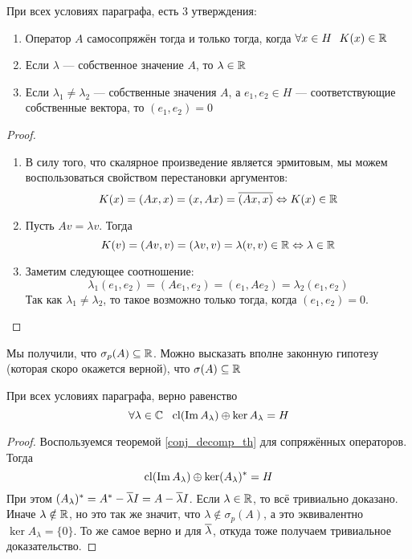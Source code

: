 \begin{theorem}
	При всех условиях параграфа, есть 3 утверждения:
	\begin{enumerate}
		\item Оператор $A$ самосопряжён тогда и только тогда, когда $\forall x \in H\ \ K(x) \in \mathbb{R}$
		
		\item Если $\lambda$ --- собственное значение $A$, то $\lambda \in \mathbb{R}$
		
		\item Если $\lambda_1 \neq \lambda_2$ --- собственные значения $A$, а $e_1, e_2 \in H$ --- соответствующие собственные вектора, то $(e_1, e_2) = 0$
	\end{enumerate}
\end{theorem}

\begin{proof}~
	\begin{enumerate}
		\item В силу того, что скалярное произведение является эрмитовым, мы можем воспользоваться свойством перестановки аргументов:
		\[
			K(x) = (Ax, x) = (x, Ax) = \overline{(Ax, x)} \Leftrightarrow K(x) \in \mathbb{R}
		\]
		
		\item Пусть $Av = \lambda v$. Тогда
		\[
			K(v) = (Av, v) = (\lambda v, v) = \lambda (v, v) \in \mathbb{R} \Leftrightarrow \lambda \in \mathbb{R}
		\]
		
		\item Заметим следующее соотношение:
		\[
			\lambda_1(e_1, e_2) = (Ae_1, e_2) = (e_1, Ae_2) = \lambda_2(e_1, e_2)
		\]
		Так как $\lambda_1 \neq \lambda_2$, то такое возможно только тогда, когда $(e_1, e_2) = 0$.
	\end{enumerate}
\end{proof}

\begin{note}
	Мы получили, что $\sigma_p(A) \subseteq \mathbb{R}$. Можно высказать вполне законную гипотезу (которая скоро окажется верной), что $\sigma(A) \subseteq \mathbb{R}$
\end{note}

\begin{theorem}
	При всех условиях параграфа, верно равенство
	\[
		\forall \lambda \in \mathbb{C}\ \ \operatorname{cl}(\operatorname{Im} A_\lambda) \oplus \ker A_\lambda = H
	\]
\end{theorem}

\begin{proof}
	Воспользуемся теоремой \ref{conj_decomp_th} для сопряжённых операторов. Тогда
	\[
		\operatorname{cl}(\operatorname{Im} A_\lambda) \oplus \ker (A_\lambda)^* = H
	\]
	При этом $(A_\lambda)^* = A^* - \overline{\lambda} I = A - \overline{\lambda} I$. Если $\lambda \in \mathbb{R}$, то всё тривиально доказано. Иначе $\lambda \notin \mathbb{R}$, но это так же значит, что $\lambda \notin \sigma_p(A)$, а это эквивалентно $\ker A_\lambda = \{0\}$. То же самое верно и для $\overline{\lambda}$, откуда тоже получаем тривиальное доказательство.
\end{proof}

